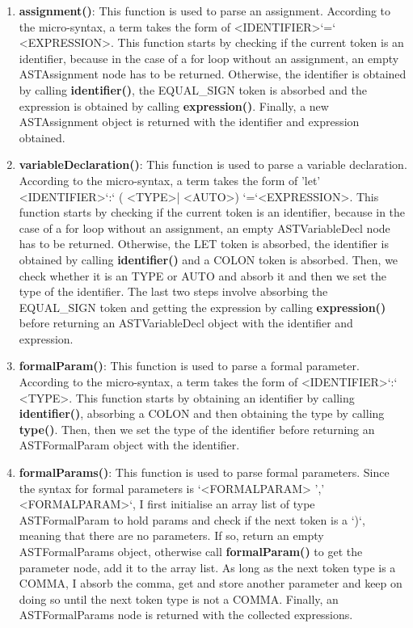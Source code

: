 \documentclass{article}
\begin{document}
\begin{enumerate}
				\item \textbf{assignment()}: This function is used to parse an assignment. According to the micro-syntax, a term takes the form of \textless IDENTIFIER\textgreater `=` \textless EXPRESSION\textgreater. This function starts by checking if the current token is an identifier, because in the case of a for loop without an assignment, an empty ASTAssignment node has to be returned. Otherwise, the identifier is obtained by calling \textbf{identifier()}, the EQUAL\_SIGN token is absorbed and the expression is obtained by calling \textbf{expression()}. Finally, a new ASTAssignment object is returned with the identifier and expression obtained.
							
				\item \textbf{variableDeclaration()}: This function is used to parse a variable declaration. According to the micro-syntax, a term takes the form of 'let' \textless IDENTIFIER\textgreater `:` ( \textless TYPE\textgreater | \textless AUTO\textgreater ) `=`\textless EXPRESSION\textgreater. This function starts by checking if the current token is an identifier, because in the case of a for loop without an assignment, an empty ASTVariableDecl node has to be returned. Otherwise, the LET token is absorbed, the identifier is obtained by calling \textbf{identifier()} and a COLON token is absorbed. Then, we check whether it is an TYPE or AUTO and absorb it and then we set the type of the identifier. The last two steps involve absorbing the EQUAL\_SIGN token and getting the expression by calling \textbf{expression()} before returning an ASTVariableDecl object with the identifier and expression.
				
				\item \textbf{formalParam()}: This function is used to parse a formal parameter. According to the micro-syntax, a term takes the form of \textless IDENTIFIER\textgreater `:` \textless TYPE\textgreater . This function starts by obtaining an identifier by calling \textbf{identifier()}, absorbing a COLON and then obtaining the type by calling \textbf{type()}. Then, then we set the type of the identifier before returning an ASTFormalParam object with the identifier.		
				
						\item \textbf{formalParams()}: This function is used to parse formal parameters. Since the syntax for formal parameters is `\textless FORMALPARAM\textgreater { ',' \textless FORMALPARAM\textgreater }`, I first initialise an array list of type ASTFormalParam to hold params and check if the next token is a `)`, meaning that there are no parameters. If so, return an empty ASTFormalParams object, otherwise call \textbf{formalParam()} to get the parameter node, add it to the array list. As long as the next token type is a COMMA, I absorb the comma, get and store another parameter and keep on doing so until the next token type is not a COMMA. Finally, an ASTFormalParams node is returned with the collected expressions.
							

\end{enumerate}
\end{document}
